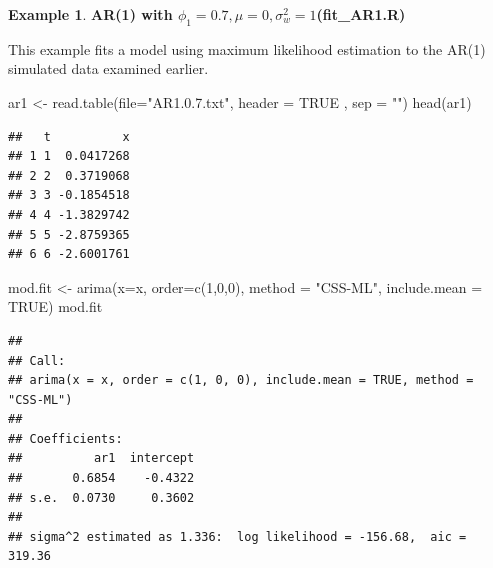 \documentclass[
]{book}
\newenvironment{Shaded}{\begin{snugshade}}{\end{snugshade}}
\newcommand{\AttributeTok}[1]{\textcolor[rgb]{0.77,0.63,0.00}{#1}}
\newcommand{\ConstantTok}[1]{\textcolor[rgb]{0.00,0.00,0.00}{#1}}
\newcommand{\DecValTok}[1]{\textcolor[rgb]{0.00,0.00,0.81}{#1}}
\newcommand{\FunctionTok}[1]{\textcolor[rgb]{0.00,0.00,0.00}{#1}}
\newcommand{\NormalTok}[1]{#1}
\newcommand{\OtherTok}[1]{\textcolor[rgb]{0.56,0.35,0.01}{#1}}
\newcommand{\SpecialCharTok}[1]{\textcolor[rgb]{0.00,0.00,0.00}{#1}}
\newcommand{\StringTok}[1]{\textcolor[rgb]{0.31,0.60,0.02}{#1}}
\theoremstyle{definition}
\theoremstyle{definition}
\newtheorem{example}{Example}[chapter]
\theoremstyle{definition}
\theoremstyle{definition}
\theoremstyle{remark}
\begin{document}
\begin{example}

\textbf{AR(1) with \(\phi_1=0.7, \mu=0, \sigma_w^2=1\)(fit\_AR1.R)}

This example fits a model using maximum likelihood estimation to the AR(1) simulated data examined earlier.

\begin{Shaded}
\begin{Highlighting}[]
\NormalTok{ar1 }\OtherTok{\textless{}{-}} \FunctionTok{read.table}\NormalTok{(}\AttributeTok{file=}\StringTok{"AR1.0.7.txt"}\NormalTok{, }\AttributeTok{header =} \ConstantTok{TRUE}\NormalTok{ , }\AttributeTok{sep =} \StringTok{""}\NormalTok{)}
\FunctionTok{head}\NormalTok{(ar1)}
\end{Highlighting}
\end{Shaded}

\begin{verbatim}
##   t          x
## 1 1  0.0417268
## 2 2  0.3719068
## 3 3 -0.1854518
## 4 4 -1.3829742
## 5 5 -2.8759365
## 6 6 -2.6001761
\end{verbatim}

\begin{Shaded}
\end{Shaded}

\begin{Shaded}
\begin{Highlighting}[]
\NormalTok{mod.fit }\OtherTok{\textless{}{-}} \FunctionTok{arima}\NormalTok{(}\AttributeTok{x=}\NormalTok{x, }\AttributeTok{order=}\FunctionTok{c}\NormalTok{(}\DecValTok{1}\NormalTok{,}\DecValTok{0}\NormalTok{,}\DecValTok{0}\NormalTok{), }\AttributeTok{method =} \StringTok{"CSS{-}ML"}\NormalTok{, }\AttributeTok{include.mean =} \ConstantTok{TRUE}\NormalTok{)}
\NormalTok{mod.fit}
\end{Highlighting}
\end{Shaded}

\begin{verbatim}
## 
## Call:
## arima(x = x, order = c(1, 0, 0), include.mean = TRUE, method = "CSS-ML")
## 
## Coefficients:
##          ar1  intercept
##       0.6854    -0.4322
## s.e.  0.0730     0.3602
## 
## sigma^2 estimated as 1.336:  log likelihood = -156.68,  aic = 319.36
\end{verbatim}


\end{example}
\end{document}
